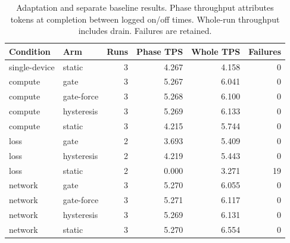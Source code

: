 \begin{table}[htbp]
\centering\small
\caption{Adaptation and separate baseline results. Phase throughput attributes tokens at completion between logged on/off times. Whole-run throughput includes drain. Failures are retained.}
\begin{tabular}{llrrrr}
\toprule
Condition & Arm & Runs & Phase TPS & Whole TPS & Failures \\
\midrule
single-device & static & 3 & 4.267 & 4.158 & 0 \\
compute & gate & 3 & 5.267 & 6.041 & 0 \\
compute & gate-force & 3 & 5.268 & 6.100 & 0 \\
compute & hysteresis & 3 & 5.269 & 6.133 & 0 \\
compute & static & 3 & 4.215 & 5.744 & 0 \\
loss & gate & 2 & 3.693 & 5.409 & 0 \\
loss & hysteresis & 2 & 4.219 & 5.443 & 0 \\
loss & static & 2 & 0.000 & 3.271 & 19 \\
network & gate & 3 & 5.270 & 6.055 & 0 \\
network & gate-force & 3 & 5.271 & 6.117 & 0 \\
network & hysteresis & 3 & 5.269 & 6.131 & 0 \\
network & static & 3 & 5.270 & 6.554 & 0 \\
\bottomrule
\end{tabular}
\end{table}
